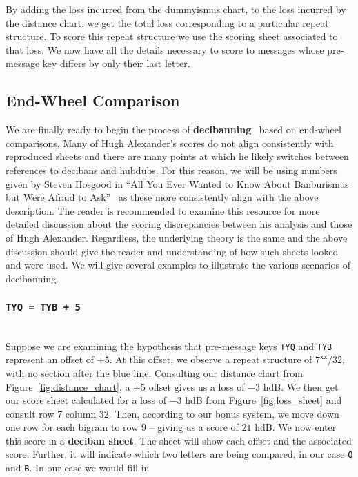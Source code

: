 \noindent By adding the loss incurred from the dummyismus chart, to
the loss incurred by the distance chart, we get the total loss
corresponding to a particular repeat structure. To score this repeat
structure we use the scoring sheet associated to that loss. We now
have all the details necessary to score to
messages whose pre-message key differs by only their last letter.

\subsection{End-Wheel Comparison}
We are finally ready to begin the process of {\bf{decibanning}}~\cite[p.~105]{Alexander1945}
based on end-wheel comparisons. Many of Hugh Alexander's scores do
not align consistently with reproduced sheets and there are many
points at which he likely switches between references to decibans
and hubdubs. For this reason, we will be using numbers given by
Steven Hosgood in ``All You Ever Wanted to Know About
Banburismus but Were Afraid to Ask''~\cite{Hosgood2007} as these more consistently align
with the above description. The reader is recommended to examine
this resource for more detailed discussion about the scoring
discrepancies between his analysis and those of Hugh Alexander.
Regardless, the underlying theory is the same and the above
discussion should give the reader and understanding of how such
sheets looked and were used. We will give several examples to
illustrate the various scenarios of decibanning.
\subsubsection{\texttt{TYQ = TYB + 5}}
\text{}\\Suppose we are examining the hypothesis that pre-message
keys \texttt{TYQ} and \texttt{TYB} represent an offset of $+5$. At
this offset, we observe a repeat structure of $7^\texttt{xx}/32$,
with no section after the blue line. Consulting our distance chart
from Figure~\ref{fig:distance_chart}, a $+5$ offset gives us a loss
of $-3$ hdB. We then get our score sheet calculated for a loss of
$-3$ hdB from Figure~\ref{fig:loss_sheet} and consult row $7$
column $32$. Then, according to our bonus system, we move down one
row for each bigram to row $9$ -- giving us a score of $21$ hdB. We
now enter this score in a  {\bf{deciban sheet}}. The sheet will
show each offset and the associated score. Further, it will
indicate which two letters are being compared, in our case
\texttt{Q} and \texttt{B}. In our case we would fill in

